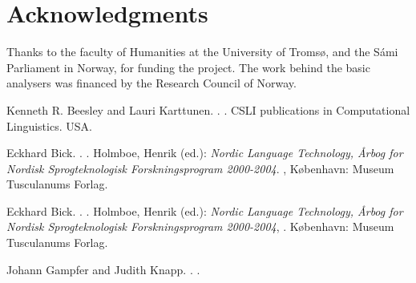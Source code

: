 \documentclass[11pt]{article}
\begin{document}
\section*{Acknowledgments}
Thanks to the faculty of Humanities at the University of Tromsø, and the Sámi Parliament in Norway, for funding the project. The work behind the basic analysers was financed by the Research Council of Norway. 



\begin{thebibliography}{}

{Kenneth R. Beesley and Lauri Karttunen}.
.
.
\newblock CSLI publications in Computational Linguistics.
\newblock USA.

{Eckhard Bick}.
.
.
\newblock Holmboe, Henrik (ed.): {\em Nordic Language Technology, Årbog for Nordisk Sprogteknologisk Forskningsprogram 2000-2004}.
,
\newblock København: Museum Tusculanums Forlag.

{Eckhard Bick}.
.
.
\newblock Holmboe, Henrik (ed.): {\em Nordic Language Technology, Årbog for Nordisk Sprogteknologisk Forskningsprogram 2000-2004},
.
\newblock København: Museum Tusculanums Forlag.


{Johann Gampfer and Judith Knapp}.
.
.



\end{thebibliography}
\end{document}
